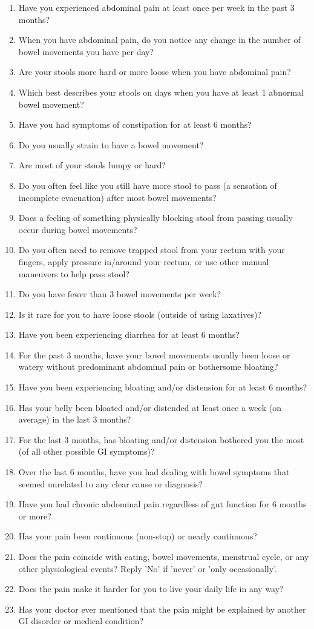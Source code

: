 \documentclass[10pt]{article}
\begin{document}
\begin{enumerate}[nosep]
\item Have you experienced abdominal pain at least once per week in the past 3 months? 
\item When you have abdominal pain, do you notice any change in the number of bowel movements you have per day? 
\item Are your stools more hard or more loose when you have abdominal pain? 
\item Which best describes your stools on days when you have at least 1 abnormal bowel movement?
\item Have you had symptoms of constipation for at least 6 months?
\item Do you usually strain to have a bowel movement?
\item Are most of your stools lumpy or hard?
\item Do you often feel like you still have more stool to pass (a sensation of incomplete evacuation) after most bowel movements?
\item Does a feeling of something physically blocking stool from passing usually occur during bowel movements?
\item Do you often need to remove trapped stool from your rectum with your fingers, apply pressure in/around your rectum, or use other manual maneuvers to help pass stool?
\item Do you have fewer than 3 bowel movements per week?
\item Is it rare for you to have loose stools (outside of using laxatives)?
\item Have you been experiencing diarrhea for at least 6 months? 
\item For the past 3 months, have your bowel movements usually been loose or watery without predominant abdominal pain or bothersome bloating?
\item Have you been experiencing bloating and/or distension for at least 6 months? 
\item Has your belly been bloated and/or distended at least once a week (on average) in the last 3 months?
\item For the last 3 months, has bloating and/or distension bothered you the most (of all other possible GI symptoms)?
\item Over the last 6 months, have you had dealing with bowel symptoms that seemed unrelated to any clear cause or diagnosis? 
\item Have you had chronic abdominal pain regardless of gut function for 6 months or more?
\item Has your pain been continuous (non-stop) or nearly continuous?
\item Does the pain coincide with eating, bowel movements, menstrual cycle, or any other physiological events?    Reply 'No' if 'never' or 'only occasionally'.
\item Does the pain make it harder for you to live your daily life in any way?
\item Has your doctor ever mentioned that the pain might be explained by another GI disorder or medical condition?
\end{enumerate}
\end{document}
